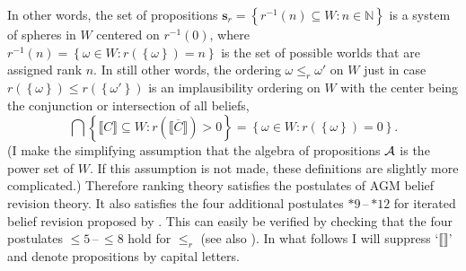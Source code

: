 In other words, the set of propositions $\textbf{s}_r=\left\{r^{-1}\left(n\right)\subseteq W:n\in\mathbb{N}\right\}$ is a system of spheres in $W$ centered on $r^{-1}\left(0\right)$, where $r^{-1}\left(n\right)=\left\{\omega\in W:r\left(\left\{\omega\right\}\right)=n\right\}$ is the set of possible worlds that are assigned rank $n$. In still other words, the ordering $\omega\leq_r \omega'$ on $W$ just in case $r\left(\left\{\omega\right\}\right)\leq r\left(\left\{\omega'\right\}\right)$ is an implausibility ordering on $W$ with the center being the conjunction or intersection of all beliefs, $$\bigcap\left\{\llbracket C\rrbracket\subseteq W:r\left(\overline{\llbracket C\rrbracket}\right)>0\right\}=\left\{\omega\in W:r\left(\left\{\omega\right\}\right)=0\right\}.$$
(I make the simplifying assumption that the algebra of propositions $\cal A$ is the power set of $W$. If this assumption is not made, these definitions are slightly more complicated.) Therefore ranking theory satisfies the postulates of AGM belief revision theory. It also satisfies the four additional postulates $*9$\,--\,$*12$ for iterated belief revision proposed by \citet{dp97}. This can easily be verified by checking that the four postulates $\leq\!5$\,--\,$\leq\!8$ hold for $\leq_r$ (see also \citealt[chapter 5.6]{s12}). %
In what follows I will suppress `$\llbracket\rrbracket$' and denote propositions by capital letters.

